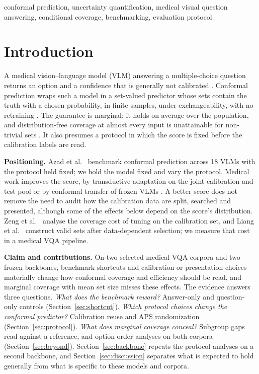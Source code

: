 \documentclass[a4paper,conference]{IEEEtran}
\begin{document}
\begin{IEEEkeywords}
conformal prediction, uncertainty quantification, medical visual question
answering, conditional coverage, benchmarking, evaluation protocol
\end{IEEEkeywords}

\section{Introduction}\label{sec:intro}

A medical vision--language model (VLM) answering a multiple-choice question
returns an option and a confidence that is generally not calibrated
\cite{guo2017calibration}. Conformal prediction wraps such a model in a
set-valued predictor whose sets contain the truth with a chosen probability, in
finite samples, under exchangeability, with no retraining
\cite{vovk2005algorithmic,lei2018distribution,angelopoulos2023gentle}. The
guarantee is marginal: it holds on average over the population, and
distribution-free coverage at almost every input is unattainable for
non-trivial sets \cite{foygelbarber2021limits}. It also presumes a protocol in
which the score is fixed before the calibration labels are read.

\textbf{Positioning.} Azad et al.\ \cite{azad2026maybe} benchmark conformal
prediction across 18 VLMs with the protocol held fixed; we hold the model fixed
and vary the protocol. Medical work improves the score, by transductive
adaptation on the joint calibration and test pool
\cite{silvarodriguez2025sca,bozorgtabar2026lata} or by conformal transfer of
frozen VLMs \cite{silvarodriguez2025zeroshot,silvarodriguez2025fca}. A better
score does not remove the need to audit how the calibration data are split,
searched and presented, although some of the effects below depend on the
score's distribution. Zeng et al.\ \cite{zeng2025tuningbias} analyse the
coverage cost of tuning on the calibration set, and Liang et al.\
\cite{liang2024selection} construct valid sets after data-dependent selection;
we measure that cost in a medical VQA pipeline.

\textbf{Claim and contributions.} On two selected medical VQA corpora and two
frozen backbones, benchmark shortcuts and calibration or presentation choices
materially change how conformal coverage and efficiency should be read, and
marginal coverage with mean set size misses these effects. The evidence answers
three questions. \emph{What does the benchmark reward?} Answer-only and
question-only controls (Section~\ref{sec:shortcut}). \emph{Which protocol
choices change the conformal predictor?} Calibration reuse and APS
randomization (Section~\ref{sec:protocol}). \emph{What does marginal coverage
conceal?} Subgroup gaps read against a reference, and option-order analyses on
both corpora (Section~\ref{sec:beyond}). Section~\ref{sec:backbone} repeats the
protocol analyses on a second backbone, and Section~\ref{sec:discussion}
separates what is expected to hold generally from what is specific to these
models and corpora.
\end{document}
